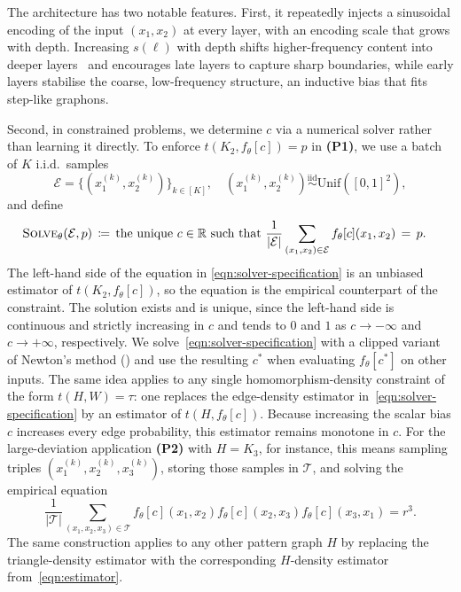 \documentclass{article}
\theoremstyle{plain}
\theoremstyle{definition}
\theoremstyle{remark}
\newcommand*{\R}{\mathbb{R}}
\begin{document}
The architecture has two notable features. First, it repeatedly injects a sinusoidal encoding of the input $(x_1, x_2)$ at every layer, with an encoding scale that grows with depth. Increasing $s(\ell)$ with depth shifts higher-frequency content into deeper layers~\citep{tancik2020fourier} and encourages late layers to capture sharp boundaries, while early layers stabilise the coarse, low-frequency structure, an inductive bias that fits step-like graphons. %

Second, in constrained problems, we determine $c$ via a numerical solver rather than learning it directly. To enforce $t(K_2, f_\theta[c]) = p$ in \textbf{(P1)}, we use a batch of $K$ i.i.d.\ samples
\[
\mathcal{E} = \bigl\{(x_1^{(k)}, x_2^{(k)})\bigr\}_{k \in [K]},
\quad
(x_1^{(k)}, x_2^{(k)}) \stackrel{\mathrm{iid}}{\sim} \mathrm{Unif}([0,1]^2),
\]
and define
\begin{align}
\textsc{Solve}_\theta(\mathcal{E}, p)
&\,\coloneqq\, \text{the unique } c \in \R \text{ such that }
\frac{1}{|\mathcal{E}|} \sum_{(x_1, x_2) \in \mathcal{E}} f_\theta[c](x_1, x_2) \,=\, p.
\label{eqn:solver-specification}
\end{align}
The left-hand side of the equation in \eqref{eqn:solver-specification} is an unbiased estimator of $t(K_2, f_\theta[c])$, so the equation is the empirical counterpart of the constraint. The solution exists and is unique, since the left-hand side is continuous and strictly increasing in $c$ and tends to $0$ and $1$ as $c \to -\infty$ and $c \to +\infty$, respectively. We solve~\eqref{eqn:solver-specification} with a clipped variant
of Newton's method () and use the resulting $c^*$ when evaluating $f_\theta[c^*]$ on other inputs.
The same idea applies to any single homomorphism-density constraint of the form $t(H, W)=\tau$: one replaces the edge-density estimator in~\eqref{eqn:solver-specification} by an estimator of $t(H, f_\theta[c])$. Because increasing the scalar bias $c$ increases every edge probability, this estimator remains monotone in $c$. For the large-deviation application \textbf{(P2)} with $H = K_3$, for instance, this means sampling triples $(x^{(k)}_1,x^{(k)}_2,x^{(k)}_3)$, storing those samples in $\mathcal{T}$, and solving the empirical equation
\[
  \frac{1}{|\mathcal{T}|}
  \sum_{(x_1,x_2,x_3)\in\mathcal{T}}
  f_\theta[c](x_1,x_2)f_\theta[c](x_2,x_3)f_\theta[c](x_3,x_1)
  = r^3.
\]
The same construction applies to any other pattern graph $H$ by replacing the triangle-density estimator with the corresponding $H$-density estimator from~\eqref{eqn:estimator}.
\end{document}
